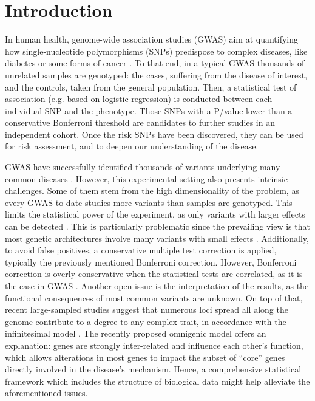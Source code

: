 \documentclass[10pt,letterpaper]{article}
\begin{document}
\section{Introduction}

In human health, genome-wide association studies (GWAS) aim at quantifying how single-nucleotide polymorphisms (SNPs) predispose to complex diseases, like diabetes or some forms of cancer \cite{bush_chapter_2012}. To that end, in a typical GWAS thousands of unrelated samples are genotyped: the cases, suffering from the disease of interest, and the controls, taken from the general population. Then, a statistical test of association (e.g. based on logistic regression) is conducted between each individual SNP and the phenotype. Those SNPs with a P\=/value lower than a conservative Bonferroni threshold are candidates to further studies in an independent cohort. Once the risk SNPs have been discovered, they can be used for risk assessment, and to deepen our understanding of the disease.

GWAS have successfully identified thousands of variants underlying many common diseases \cite{buniello_nhgri-ebi_2019}. However, this experimental setting also presents intrinsic challenges. Some of them stem from the high dimensionality of the problem, as every GWAS to date studies more variants than samples are genotyped. This limits the statistical power of the experiment, as only variants with larger effects can be detected \cite{visscher_10_2017}. This is particularly problematic since the prevailing view is that most genetic architectures involve many variants with small effects \cite{visscher_10_2017}. Additionally, to avoid false positives, a conservative multiple test correction is applied, typically the previously mentioned Bonferroni correction. However, Bonferroni correction is overly conservative when the statistical tests are correlated, as it is the case in GWAS \cite{wang_statistical_2018}. Another open issue is the interpretation of the results, as the functional consequences of most common variants are unknown. On top of that, recent large-sampled studies suggest that numerous loci spread all along the genome contribute to a degree to any complex trait, in accordance with the infinitesimal model \cite{barton_infinitesimal_2017}. The recently proposed omnigenic model \cite{boyle_expanded_2017} offers an explanation: genes are strongly inter-related and influence each other's function, which allows alterations in most genes to impact the subset of ``core'' genes directly involved in the disease's mechanism. Hence, a comprehensive statistical framework which includes the structure of biological data might help alleviate the aforementioned issues.
\end{document}

